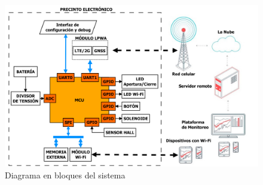 \documentclass[
11pt, %
]{charter}
\begin{document}
\begin{figure}[htpb]
\centering 
\includegraphics[width=1\textwidth]{./Figuras/diagrama_proyecto.pdf}
\caption{Diagrama en bloques del sistema}
\label{fig:diagBloques}
\end{figure} 
\end{document}
